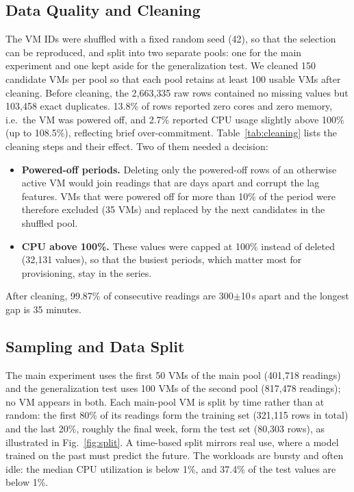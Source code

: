 \documentclass[conference,letterpaper,10pt]{IEEEtran}
\begin{document}
\subsection{Data Quality and Cleaning}
The VM IDs were shuffled with a fixed random seed (42), so that the selection can be reproduced, and split into two separate pools: one for the main experiment and one kept aside for the generalization test. We cleaned 150 candidate VMs per pool so that each pool retains at least 100 usable VMs after cleaning. Before cleaning, the 2{,}663{,}335 raw rows contained no missing values but 103{,}458 exact duplicates. 13.8\% of rows reported zero cores and zero memory, i.e.\ the VM was powered off, and 2.7\% reported CPU usage slightly above 100\% (up to 108.5\%), reflecting brief over-commitment. Table~\ref{tab:cleaning} lists the cleaning steps and their effect. Two of them needed a decision:
\begin{itemize}
  \item \textbf{Powered-off periods.} Deleting only the powered-off rows of an otherwise active VM would join readings that are days apart and corrupt the lag features. VMs that were powered off for more than 10\% of the period were therefore excluded (35 VMs) and replaced by the next candidates in the shuffled pool.
  \item \textbf{CPU above 100\%.} These values were capped at 100\% instead of deleted (32{,}131 values), so that the busiest periods, which matter most for provisioning, stay in the series.
\end{itemize}
After cleaning, 99.87\% of consecutive readings are 300$\pm$10\,s apart and the longest gap is 35 minutes.



\subsection{Sampling and Data Split}
The main experiment uses the first 50 VMs of the main pool (401{,}718 readings) and the generalization test uses 100 VMs of the second pool (817{,}478 readings); no VM appears in both. Each main-pool VM is split by time rather than at random: the first 80\% of its readings form the training set (321{,}115 rows in total) and the last 20\%, roughly the final week, form the test set (80{,}303 rows), as illustrated in Fig.~\ref{fig:split}. A time-based split mirrors real use, where a model trained on the past must predict the future. The workloads are bursty and often idle: the median CPU utilization is below 1\%, and 37.4\% of the test values are below 1\%.
\end{document}
